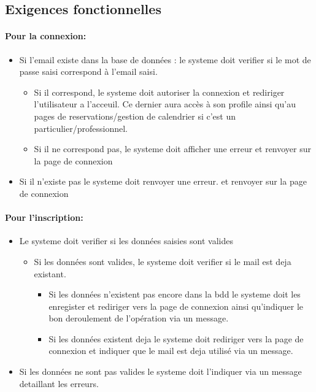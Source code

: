 \documentclass{article}
\begin{document}
\subsection{Exigences fonctionnelles}
\paragraph{Pour la connexion: }


\begin{itemize}
\item Si l'email existe dans la base de données : 
	le systeme doit verifier si le mot de passe saisi
	correspond à l'email saisi.
		\begin{itemize}
		\item Si il correspond, le systeme doit autoriser la connexion et
			rediriger l'utilisateur a l'acceuil. Ce dernier aura accès à son
			profile ainsi qu'au pages de reservations/gestion de calendrier
			si c'est un particulier/professionnel.
		\item Si il ne correspond pas, le systeme doit afficher une erreur
			et renvoyer sur la page de connexion
		\end{itemize}
\item Si il n'existe pas le systeme doit renvoyer une erreur.
	et renvoyer sur la page de connexion
\end{itemize}


\paragraph{Pour l'inscription: }
\begin{itemize}
\item Le systeme doit verifier si les données saisies sont valides
	\begin{itemize}
	\item Si les données sont valides, le systeme doit verifier si le mail
		est deja existant.
		\begin{itemize}
		\item Si les données n'existent pas encore dans la bdd le systeme
			doit les enregister et rediriger vers la page de connexion
			ainsi qu'indiquer le bon deroulement de l'opération via un message.
		\item Si les données existent deja le systeme doit rediriger vers
			la page de connexion et indiquer que le mail est deja utilisé
			via un message.
		\end{itemize}
	\end{itemize}
\item Si les données ne sont pas valides le systeme doit l'indiquer
	via un message detaillant les erreurs.
\end{itemize}
\end{document}
